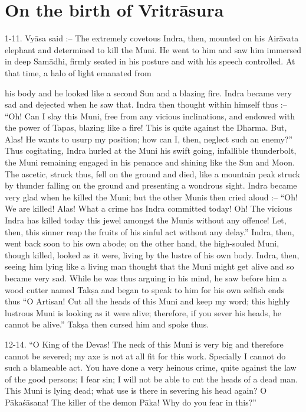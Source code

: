 \chapter{On the birth of Vritr\=asura}

1-11. Vy\=asa said :-- The extremely covetous Indra, then, mounted on his Air\=avata elephant and determined to kill the Muni. He went to him and saw him immersed in deep Sam\=adhi, firmly seated in his posture and with his speech controlled. At that time, a halo of light emanated from

his body and he looked like a second Sun and a blazing fire. Indra became very sad and dejected when he saw that. Indra then thought within himself thus :-- ``Oh! Can I slay this Muni, free from any vicious inclinations, and endowed with the power of Tapas, blazing like a fire! This is quite against the Dharma. But, Alas! He wants to usurp my position; how can I, then, neglect such an enemy?'' Thus cogitating, Indra hurled at the Muni his swift going, infallible thunderbolt, the Muni remaining engaged in his penance and shining like the Sun and Moon. The ascetic, struck thus, fell on the ground and died, like a mountain peak struck by thunder falling on the ground and presenting a wondrous sight. Indra became very glad when he killed the Muni; but the other Munis then cried aloud :-- ``Oh! We are killed! Alas! What a crime has Indra committed today! Oh! The vicious Indra has killed today this jewel amongst the Munis without any offence! Let, then, this sinner reap the fruits of his sinful act without any delay.'' Indra, then, went back soon to his own abode; on the other hand, the high-souled Muni, though killed, looked as it were, living by the lustre of his own body. Indra, then, seeing him lying like a living man thought that the Muni might get alive and so became very sad. While he was thus arguing in his mind, he saw before him a wood cutter named Tak\d{s}a and began to speak to him for his own selfish ends thus ``O Artisan! Cut all the heads of this Muni and keep my word; this highly lustrous Muni is looking as it were alive; therefore, if you sever his heads, he cannot be alive.'' Tak\d{s}a then cursed him and spoke thus.

12-14. ``O King of the Devas! The neck of this Muni is very big and therefore cannot be severed; my axe is not at all fit for this work. Specially I cannot do such a blameable act. You have done a very heinous crime, quite against the law of the good persons; I fear sin; I will not be able to cut the heads of a dead man. This Muni is lying dead; what use is there in severing his head again? O P\=aka\'s\=asana! The killer of the demon P\=aka! Why do you fear in this?''


